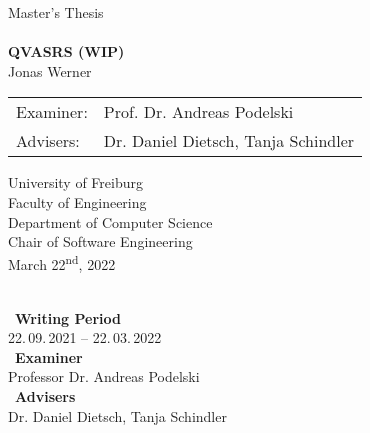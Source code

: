 
\begin{titlepage}
\begin{center}


{\Large Master's Thesis}\\[1.3cm]


\HorizontalLine \\[0.4cm]
{ \huge \bfseries QVASRS (WIP) }
\HorizontalLine \\[1.5cm]


{\Huge Jonas Werner } \\[2cm]


\begin{tabular}[hc]{>{\huge}l >{\huge}l}
  Examiner: & Prof. Dr. Andreas Podelski \\[0.3cm]
  Advisers: & Dr. Daniel Dietsch, Tanja Schindler \\[1.2cm]
\end{tabular}
\vfill  %

\Large {
    University of Freiburg\\
    Faculty of Engineering\\
    Department of Computer Science\\
    Chair of Software Engineering\\[1cm]

    March 22\textsuperscript{nd}, 2022\\
}
\end{center}
\end{titlepage}

\thispagestyle{empty}
\ \vfill \ \\  %
\
\textbf{Writing Period}            \smallskip{} \\
22.\,09.\,2021 -- 22.\,03.\,2022   \bigskip{} \\
\
\textbf{Examiner}                  \smallskip{} \\
Professor Dr. Andreas Podelski                     \bigskip{} \\
\
\textbf{Advisers}                  \smallskip{} \\
Dr. Daniel Dietsch, Tanja Schindler
\pagebreak